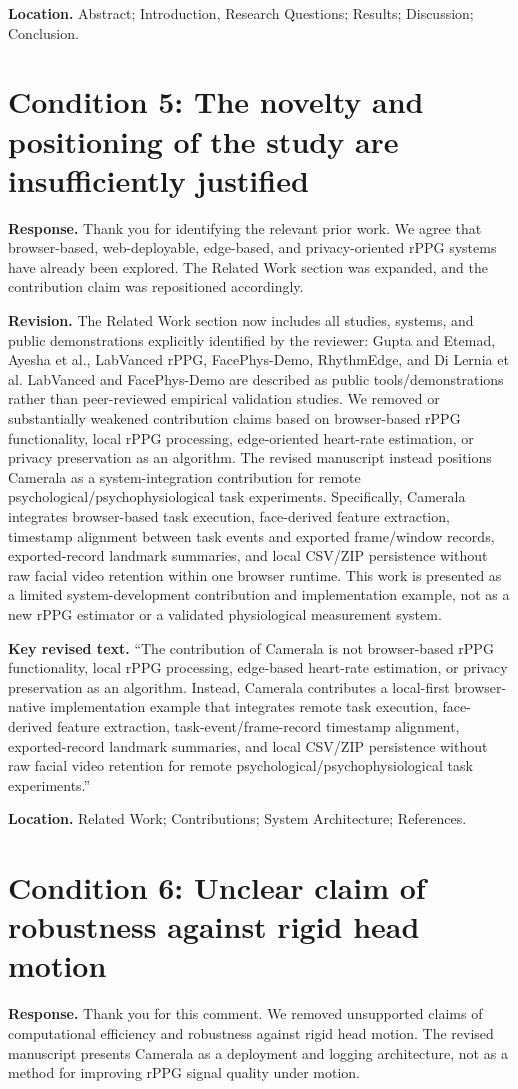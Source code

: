 \documentclass[11pt]{article}
\newcommand{\condition}[2]{\section*{Condition #1: #2}}
\begin{document}
\textbf{Location.}
Abstract; Introduction, Research Questions; Results; Discussion; Conclusion.

\condition{5}{The novelty and positioning of the study are insufficiently justified}
\textbf{Response.}
Thank you for identifying the relevant prior work.
We agree that browser-based, web-deployable, edge-based, and privacy-oriented rPPG systems have already been explored.
The Related Work section was expanded, and the contribution claim was repositioned accordingly.

\textbf{Revision.}
The Related Work section now includes all studies, systems, and public demonstrations explicitly identified by the reviewer: Gupta and Etemad, Ayesha et al., LabVanced rPPG, FacePhys-Demo, RhythmEdge, and Di Lernia et al.
LabVanced and FacePhys-Demo are described as public tools/demonstrations rather than peer-reviewed empirical validation studies.
We removed or substantially weakened contribution claims based on browser-based rPPG functionality, local rPPG processing, edge-oriented heart-rate estimation, or privacy preservation as an algorithm.
The revised manuscript instead positions Camerala as a system-integration contribution for remote psychological/psychophysiological task experiments.
Specifically, Camerala integrates browser-based task execution, face-derived feature extraction, timestamp alignment between task events and exported frame/window records, exported-record landmark summaries, and local CSV/ZIP persistence without raw facial video retention within one browser runtime.
This work is presented as a limited system-development contribution and implementation example, not as a new rPPG estimator or a validated physiological measurement system.

\textbf{Key revised text.}
``The contribution of Camerala is not browser-based rPPG functionality, local rPPG processing, edge-based heart-rate estimation, or privacy preservation as an algorithm. Instead, Camerala contributes a local-first browser-native implementation example that integrates remote task execution, face-derived feature extraction, task-event/frame-record timestamp alignment, exported-record landmark summaries, and local CSV/ZIP persistence without raw facial video retention for remote psychological/psychophysiological task experiments.''

\textbf{Location.}
Related Work; Contributions; System Architecture; References.

\condition{6}{Unclear claim of robustness against rigid head motion}
\textbf{Response.}
Thank you for this comment.
We removed unsupported claims of computational efficiency and robustness against rigid head motion.
The revised manuscript presents Camerala as a deployment and logging architecture, not as a method for improving rPPG signal quality under motion.
\end{document}
